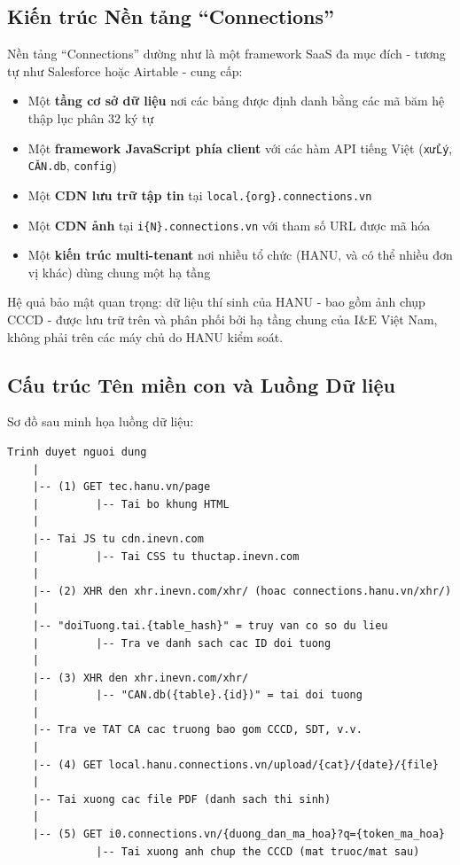 \documentclass[12pt,a4paper]{article}
\begin{document}
\subsection{Kiến trúc Nền tảng ``Connections''}

Nền tảng ``Connections'' dường như là một framework SaaS đa mục đích - tương tự như Salesforce hoặc Airtable - cung cấp:

\begin{itemize}
    \item Một \textbf{tầng cơ sở dữ liệu} nơi các bảng được định danh bằng các mã băm hệ thập lục phân 32 ký tự
    \item Một \textbf{framework JavaScript phía client} với các hàm API tiếng Việt (\texttt{xửLý}, \texttt{CĂN.db}, \texttt{config})
    \item Một \textbf{CDN lưu trữ tập tin} tại \texttt{local.\{org\}.connections.vn}
    \item Một \textbf{CDN ảnh} tại \texttt{i\{N\}.connections.vn} với tham số URL được mã hóa
    \item Một \textbf{kiến trúc multi-tenant} nơi nhiều tổ chức (HANU, và có thể nhiều đơn vị khác) dùng chung một hạ tầng
\end{itemize}

Hệ quả bảo mật quan trọng: dữ liệu thí sinh của HANU - bao gồm ảnh chụp CCCD - được lưu trữ trên và phân phối bởi hạ tầng chung của I\&E Việt Nam, không phải trên các máy chủ do HANU kiểm soát.

\subsection{Cấu trúc Tên miền con và Luồng Dữ liệu}

Sơ đồ sau minh họa luồng dữ liệu:

\begin{lstlisting}[language={},title={Luồng dữ liệu: Từ trình duyệt đến Dữ liệu cá nhân thí sinh}]
Trinh duyet nguoi dung
    |
    |-- (1) GET tec.hanu.vn/page
    |         |-- Tai bo khung HTML
    |
    |-- Tai JS tu cdn.inevn.com
    |         |-- Tai CSS tu thuctap.inevn.com
    |
    |-- (2) XHR den xhr.inevn.com/xhr/ (hoac connections.hanu.vn/xhr/)
    |
    |-- "doiTuong.tai.{table_hash}" = truy van co so du lieu
    |         |-- Tra ve danh sach cac ID doi tuong
    |
    |-- (3) XHR den xhr.inevn.com/xhr/
    |         |-- "CAN.db({table}.{id})" = tai doi tuong
    |
    |-- Tra ve TAT CA cac truong bao gom CCCD, SDT, v.v.
    |
    |-- (4) GET local.hanu.connections.vn/upload/{cat}/{date}/{file}
    |
    |-- Tai xuong cac file PDF (danh sach thi sinh)
    |
    |-- (5) GET i0.connections.vn/{duong_dan_ma_hoa}?q={token_ma_hoa}
              |-- Tai xuong anh chup the CCCD (mat truoc/mat sau)
\end{lstlisting}
\end{document}
